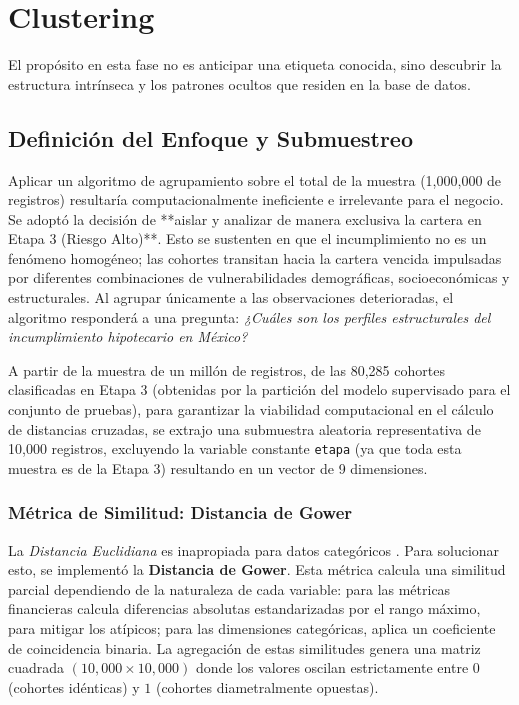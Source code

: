 \section{Clustering}
El propósito en esta fase no es anticipar una etiqueta conocida, sino descubrir la estructura intrínseca y los patrones ocultos que residen en la base de datos. 

\subsection{Definición del Enfoque y Submuestreo}
Aplicar un algoritmo de agrupamiento sobre el total de la muestra (1,000,000 de registros) resultaría computacionalmente ineficiente e irrelevante para el negocio. Se adoptó la decisión de **aislar y analizar de manera exclusiva la cartera en Etapa 3 (Riesgo Alto)**. Esto se sustenten en que el incumplimiento no es un fenómeno homogéneo; las cohortes transitan hacia la cartera vencida impulsadas por diferentes combinaciones de vulnerabilidades demográficas, socioeconómicas y estructurales. Al agrupar únicamente a las observaciones deterioradas, el algoritmo responderá a una pregunta: \textit{¿Cuáles son los perfiles estructurales del incumplimiento hipotecario en México?}

A partir de la muestra de un millón de registros, de las 80,285 cohortes clasificadas en Etapa 3 (obtenidas por la partición del modelo supervisado para el conjunto de pruebas), para garantizar la viabilidad computacional en el cálculo de distancias cruzadas, se extrajo una submuestra aleatoria representativa de 10,000 registros, excluyendo la variable constante \texttt{etapa} (ya que toda esta muestra es de la Etapa 3) resultando en un vector de 9 dimensiones.

\subsubsection{Métrica de Similitud: Distancia de Gower}
La \textit{Distancia Euclidiana} es inapropiada para datos categóricos . Para solucionar esto, se implementó la \textbf{Distancia de Gower}. Esta métrica calcula una similitud parcial dependiendo de la naturaleza de cada variable: para las métricas financieras calcula diferencias absolutas estandarizadas por el rango máximo, para mitigar los atípicos; para las dimensiones categóricas, aplica un coeficiente de coincidencia binaria. La agregación de estas similitudes genera una matriz cuadrada $(10,000 \times 10,000)$ donde los valores oscilan estrictamente entre $0$ (cohortes idénticas) y $1$ (cohortes diametralmente opuestas).

